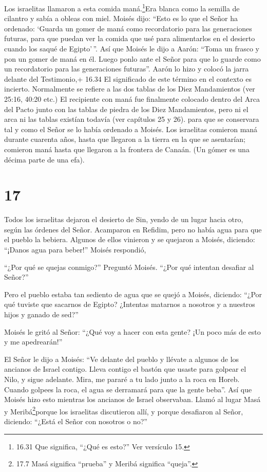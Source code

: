  Los israelitas llamaron a esta comida maná.\footnote{16.31
  Que significa, ``¿Qué es esto?'' Ver versículo 15.}Era blanca como la
semilla de cilantro y sabía a obleas con miel.  Moisés
dijo: ``Esto es lo que el Señor ha ordenado: `Guarda un gomer de maná
como recordatorio para las generaciones futuras, para que puedan ver la
comida que usé para alimentarlos en el desierto cuando los saqué de
Egipto'\,''.  Así que Moisés le dijo a Aarón: ``Toma un
frasco y pon un gomer de maná en él. Luego ponlo ante el Señor para que
lo guarde como un recordatorio para las generaciones futuras''.
 Aarón lo hizo y colocó la jarra delante del Testimonio,+
16.34 El significado de este término en el contexto es incierto.
Normalmente se refiere a las dos tablas de los Diez Mandamientos (ver
25:16, 40:20 etc.) El recipiente con maná fue finalmente colocado dentro
del Arca del Pacto junto con las tablas de piedra de los Diez
Mandamientos, pero ni el arca ni las tablas existían todavía (ver
capítulos 25 y 26). para que se conservara tal y como el Señor se lo
había ordenado a Moisés.  Los israelitas comieron maná
durante cuarenta años, hasta que llegaron a la tierra en la que se
asentarían; comieron maná hasta que llegaron a la frontera de Canaán.
 (Un gómer es una décima parte de una efa).

\hypertarget{section-16}{%
\section{17}\label{section-16}}

 Todos los israelitas dejaron el desierto de Sin, yendo de
un lugar hacia otro, según las órdenes del Señor. Acamparon en Refidim,
pero no había agua para que el pueblo la bebiera.  Algunos
de ellos vinieron y se quejaron a Moisés, diciendo: ``¡Danos agua para
beber!'' Moisés respondió,

``¿Por qué se quejas conmigo?'' Preguntó Moisés. ``¿Por qué intentan
desafiar al Señor?''

 Pero el pueblo estaba tan sediento de agua que se quejó a
Moisés, diciendo: ``¿Por qué tuviste que sacarnos de Egipto? ¿Intentas
matarnos a nosotros y a nuestros hijos y ganado de sed?''

 Moisés le gritó al Señor: ``¿Qué voy a hacer con esta
gente? ¡Un poco más de esto y me apedrearán!''

 El Señor le dijo a Moisés: ``Ve delante del pueblo y
llévate a algunos de los ancianos de Israel contigo. Lleva contigo el
bastón que usaste para golpear el Nilo, y sigue adelante. 
Mira, me pararé a tu lado junto a la roca en Horeb. Cuando golpees la
roca, el agua se derramará para que la gente beba''. Así que Moisés hizo
esto mientras los ancianos de Israel observaban.  Llamó al
lugar Masá y Meribá\footnote{17.7 Masá significa ``prueba'' y Meribá
  significa ``queja''.}porque los israelitas discutieron allí, y porque
desafiaron al Señor, diciendo: ``¿Está el Señor con nosotros o no?''

